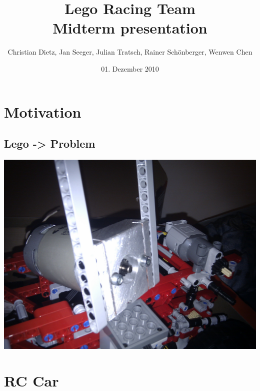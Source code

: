 \documentclass[pdf]{beamer}
\begin{document}
\title[Lego Racing Team]{Lego Racing Team\\\small{Midterm presentation}}
\author[...]{Christian Dietz, Jan Seeger, Julian Tratsch, Rainer Sch\"{o}nberger, Wenwen Chen\\}
\date{01. Dezember 2010}

\subject{Midterm presentation}

\frame{
 \titlepage
}



\section{Motivation}
\subsection{Lego -> Problem}
\begin{frame}
  \begin{center}
  \includegraphics[width = \textwidth]{pics/raw/legomotor.jpg}
  \end{center}
\end{frame}

\section{RC Car}
\end{document}

